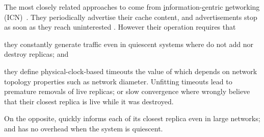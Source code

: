 \begin{asparadesc}


\noindent The most closely related approaches to \NAME come from
\underline{i}nformation-\underline{c}entric \underline{n}etworking
(ICN)~\cite{garcia-lopez, hemmati2015namebased}. They periodically
advertise their cache content, and advertisements stop as soon as they
reach uninterested \processes. However their operation requires that
\begin{inparaenum}[(i)]
\item they constantly generate traffic even in quiescent systems where
  \processes do not add nor destroy replicas; and 
\item they define physical-clock-based timeouts the value of which
  depends on network topology properties such as network diameter.
  Unfitting timeouts lead to premature removals of live replicas; or
  slow convergence where \processes wrongly believe that their closest
  replica is live while it was destroyed.
\end{inparaenum}
On the opposite, \NAME quickly informs each \process of its closest
replica even in large networks; %
and has no overhead when the system is quiescent.

\end{asparadesc}


